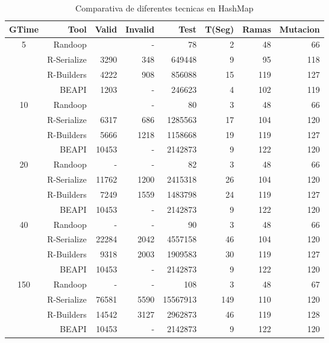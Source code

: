 \begin{table}[H]
\scriptsize
\centering
\begin{tabular}{ c  r  |r | r | r|r|r|r  }
  \toprule
  \textbf{GTime} & \textbf{Tool} & \textbf{Valid}  & \textbf{Invalid} & \textbf{Test}&\textbf{T(Seg)} &\textbf{Ramas}  & \textbf{Mutacion} \\ 
  \midrule
5	&	Randoop	&		&	-	&	78	&	2	&	48	&	66	\\
	&	R-Serialize	&	3290	&	348	&	649448	&	9	&	95	&	118	\\
	&	R-Builders	&	4222	& 908		&	856088	&	15	&	119	&	127	\\
	&	BEAPI	&	1203	&	-	&	246623	&	4	&	102	&	119	 \\
 \cline{2-8}															
10	&	Randoop	&		&	-	&	80	&	3	&	48	&	66	\\
	&	R-Serialize	&	6317	&	686	&	1285563	&	17	&	104	&	120	\\
	&	R-Builders	&	5666	&	1218	&	1158668	&	19	&	119	&	127	\\
	&	BEAPI	&	10453	&	-	&	2142873	&	9	&	122	&	120	\\
 \cline{2-8}															
20	&	Randoop	&	-	&	-	&	82	&	3	&	48	&	66	\\
	&	R-Serialize	&	11762	&	1200	&	2415318	&	26	&	104	&	120	\\
	&	R-Builders	&	7249	&	1559	&	1483798	&	24	&	119	&	127	\\
	&	BEAPI	&	10453	&	-	&	2142873	&	9	&	122	&	120	 \\
 \cline{2-8}															
40	&	Randoop	&	-	&	-	&	90	&	3	&	48	&	66	\\
	&	R-Serialize	&	22284	&	2042	&	4557158	&	46	&	104	&	120	\\
	&	R-Builders	&	9318	& 2003	&	1909583	&	30	&	119	&	127	\\
	&	BEAPI	&	10453	&	-	&	2142873	&	9	&	122	&	120	\\ 
 \cline{2-8}															
150	&	Randoop	&	-	&	-	&	108	&	3	&	48	&	67	\\
	&	R-Serialize	&	76581	&	5590	&	15567913	&	149	&	110	&	120	\\
	&	R-Builders	&	14542	&	3127	&	2962873	&	46	&	119	&	128	\\
	&	BEAPI	&	10453	&	-	&	2142873	&	9	&	122	&	120		\\
\midrule
\end{tabular}
\caption{Comparativa de diferentes tecnicas en HashMap}
\label{tab:hashMapTools}
\end{table}